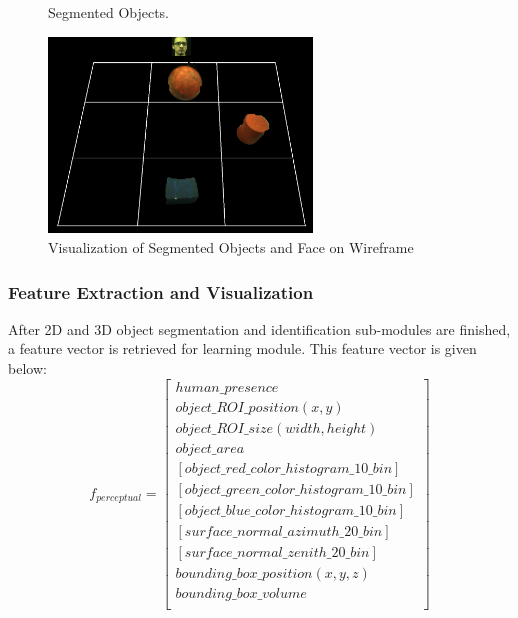 \documentclass[runningheads,a4paper]{llncs}
\begin{document}
\begin{itemize}
\begin{figure}[ht]
\begin{minipage}[b]{0.5\linewidth}
\caption{Segmented Objects.}
\label{fig:Hue Channel Thresholding and Segmentation}
\end{minipage}
\hspace{0.5cm}
\begin{minipage}[b]{0.5\linewidth}
\centering
\includegraphics[width=70mm]{imgs/wireframeLast.png}
\caption{Visualization of Segmented Objects and Face on Wireframe }
\label{fig:Visualization of Segmented Objects and Face on Wireframe}
\end{minipage}
\end{figure}
\end{itemize}

\subsubsection{Feature Extraction and Visualization}

After 2D and 3D object segmentation and identification sub-modules are finished, a feature vector is retrieved for learning module. This feature vector is given below: \\
\[
f_{perceptual} =
\left[ {\begin{array}{cc}
{human\_presence} \\
{object\_ROI\_position (x, y)} \\
{object\_ROI\_size (width, height)} \\
{object\_area} \\
{[object\_red\_color\_histogram\_10\_bin]} \\
{[object\_green\_color\_histogram\_10\_bin]} \\
{[object\_blue\_color\_histogram\_10\_bin]} \\
{[surface\_normal\_azimuth\_20\_bin]} \\
{[surface\_normal\_zenith\_20\_bin]} \\
{bounding\_box\_position (x, y, z)} \\
{bounding\_box\_volume} \\
\end{array} } \right]
\]				      
\end{document}
